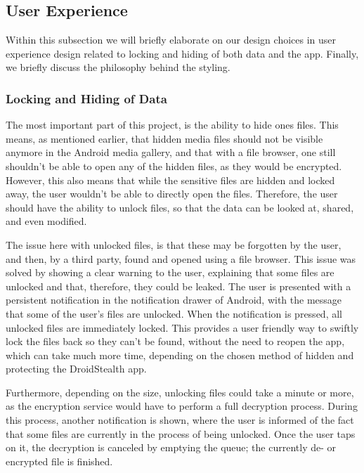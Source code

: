 \subsection{User Experience}
\label{sec:approach-and-design:user-experience}

Within this subsection we will briefly elaborate on our design
choices in user experience design related to locking and hiding
of both data and the app. Finally, we briefly discuss the 
philosophy behind the styling. 

\subsubsection{Locking and Hiding of Data}

The most important part of this project, is the ability to hide
ones files. This means, as mentioned earlier, that hidden media
files should not be visible anymore in the Android media
gallery, and that with a file browser, one still shouldn't be
able to open any of the hidden files, as they would be
encrypted. However, this also means that while the sensitive
files are hidden and locked away, the user wouldn't be able to
directly open the files. Therefore, the user should have the
ability to unlock files, so that the data can be looked at,
shared, and even modified.

The issue here with unlocked files, is that these may be
forgotten by the user, and then, by a third party, found and
opened using a file browser. This issue was solved by showing
a clear warning to the user, explaining that some files are
unlocked and that, therefore, they could be leaked.
The user is presented with a persistent notification in the
notification drawer of Android, with the message that some of
the user's files are unlocked. When the notification is pressed,
all unlocked files are immediately locked. This
provides a user friendly way to swiftly lock the files back so
they can't be found, without the need to reopen the app, which
can take much more time, depending on the chosen method of
hidden and protecting the DroidStealth app. 

Furthermore, depending on the size, unlocking files could take a
minute or more, as the encryption service would have to perform a
full decryption process. During this process, another notification 
is shown, where the user is informed
of the fact that some files are currently in the process of
being unlocked. Once the user taps on it, the decryption is
canceled by emptying the queue; the currently de- or encrypted file is finished.


